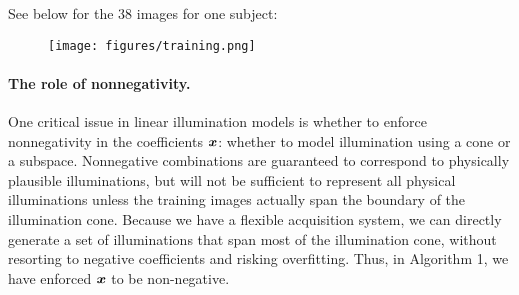 \documentclass[10pt,twocolumn,letterpaper]{article}
\begin{document}
See below for the 38 images for one subject:
\begin{figure}[h]
\texttt{[image: figures/training.png]}
\end{figure}
\vspace{-6mm}
\paragraph{The role of nonnegativity.} 
One critical issue in linear illumination models is whether to enforce nonnegativity in the coefficients ${\boldsymbol{x}}$: whether to model illumination using a cone or a subspace. Nonnegative combinations are guaranteed to correspond to physically plausible illuminations, but will not be sufficient to represent all physical illuminations unless the training images actually span the boundary of the illumination cone. Because we have a flexible acquisition system, we can directly generate a set of illuminations that span most of the illumination cone, without resorting to negative coefficients and risking overfitting. Thus, in Algorithm 1, we have enforced ${\boldsymbol{x}}$ to be non-negative.





\end{document}
